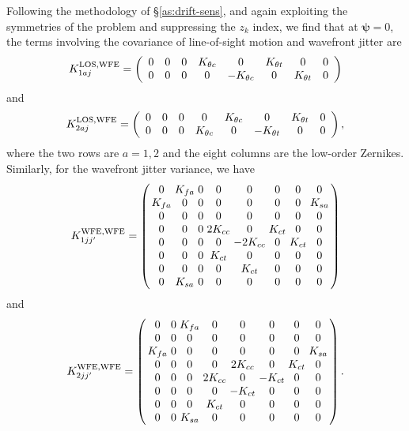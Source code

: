 \documentclass[aps,prd, amsmath,amssymb,superscriptaddress,showkeys,nofootinbib,reprint,preprintnumbers]{revtex4-1}
\begin{document}
Following the methodology of \S\ref{as:drift-sens}, and again
exploiting the symmetries of the problem and suppressing the $z_k$
index, we find that at ${\boldsymbol\psi}=0$, the terms involving the
covariance of line-of-sight motion and wavefront jitter are
\begin{equation}
K_{1aj}^{\rm LOS,WFE} = \left( \begin{array}{cccccccc}
0 & 0 & 0 & K_{\theta c} & 0 & K_{\theta t} & 0 & 0 \\
0 & 0 & 0 & 0 & -K_{\theta c} & 0 & K_{\theta t} & 0
\end{array} \right)
\label{eq:temp.078524}
\end{equation}
and
\begin{equation}
K_{2aj}^{\rm LOS,WFE} = \left( \begin{array}{cccccccc}
0 & 0 & 0 & 0 & K_{\theta c} & 0 & K_{\theta t} & 0 \\
0 & 0 & 0 & K_{\theta c} & 0 & -K_{\theta t} & 0 & 0
\end{array} \right),
\end{equation}
where the two rows are $a=1,2$ and the eight columns are the low-order
Zernikes. Similarly, for the wavefront jitter variance, we have
\begin{equation}
\setlength\arraycolsep{1.5pt}
K_{1jj'}^{\rm WFE,WFE} = \left( \begin{array}{cccccccc}
0 & K_{fa} & 0 & 0 & 0 & 0 & 0 & 0 \\
K_{fa} & 0 & 0 & 0 & 0 & 0 & 0 & K_{sa} \\
0 & 0 & 0 & 0 & 0 & 0 & 0 & 0 \\
0 & 0 & 0 & 2K_{cc} & 0 & K_{ct} & 0 & 0 \\
0 & 0 & 0 & 0 & -2K_{cc} & 0 & K_{ct} & 0 \\
0 & 0 & 0 & K_{ct} & 0 & 0 & 0 & 0 \\
0 & 0 & 0 & 0 & K_{ct} & 0 & 0 & 0 \\
0 & K_{sa} & 0 & 0 & 0 & 0 & 0 & 0 \\
\end{array} \right)
\end{equation}
and
\begin{equation}
\setlength\arraycolsep{1.5pt}
K_{2jj'}^{\rm WFE,WFE} = \left( \begin{array}{cccccccc}
0 & 0 & K_{fa} & 0 & 0 & 0 & 0 & 0 \\
0 & 0 & 0 & 0 & 0 & 0 & 0 & 0 \\
K_{fa} & 0 & 0 & 0 & 0 & 0 & 0 & K_{sa} \\
0 & 0 & 0 & 0 & 2K_{cc} & 0 & K_{ct} & 0 \\
0 & 0 & 0 & 2K_{cc} & 0 & -K_{ct} & 0 & 0 \\
0 & 0 & 0 & 0 & -K_{ct} & 0 & 0 & 0 \\
0 & 0 & 0 & K_{ct} & 0 & 0 & 0 & 0 \\
0 & 0 & K_{sa} & 0 & 0 & 0 & 0 & 0 \\
\end{array} \right).
\end{equation}
\end{document}
